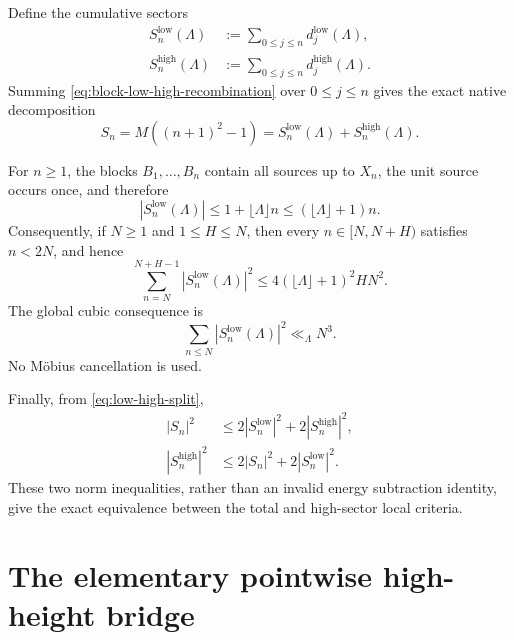 \documentclass[11pt]{article}
\theoremstyle{definition}
\theoremstyle{remark}
\newcommand{\1}{\mathbf{1}}
\begin{document}
Define the cumulative sectors
\begin{align}
 S_n^{\mathrm{low}}(\Lambda)
 &:={}
 \sum_{0\le j\le n}d_j^{\mathrm{low}}(\Lambda),
 \label{eq:low-prefix}\\
 S_n^{\mathrm{high}}(\Lambda)
 &:={}
 \sum_{0\le j\le n}d_j^{\mathrm{high}}(\Lambda).
 \label{eq:high-prefix}
\end{align}
Summing \cref{eq:block-low-high-recombination} over $0\le j\le n$ gives the exact native decomposition
\begin{equation}
 \boxed{
 S_n=M((n+1)^2-1)
 =S_n^{\mathrm{low}}(\Lambda)+S_n^{\mathrm{high}}(\Lambda).
 }
 \label{eq:low-high-split}
\end{equation}

For $n\ge1$, the blocks $B_1,\ldots,B_n$ contain all sources up to $X_n$, the unit source occurs once, and therefore
\begin{equation}
 |S_n^{\mathrm{low}}(\Lambda)|
 \le1+\lfloor\Lambda\rfloor n
 \le(\lfloor\Lambda\rfloor+1)n.
 \label{eq:low-prefix-bound}
\end{equation}
Consequently, if $N\ge1$ and $1\le H\le N$, then every
$n\in[N,N+H)$ satisfies $n<2N$, and hence
\begin{equation}
 \boxed{
 \sum_{n=N}^{N+H-1}
 |S_n^{\mathrm{low}}(\Lambda)|^2
 \le
 4(\lfloor\Lambda\rfloor+1)^2HN^2.
 }
 \label{eq:low-local-bound}
\end{equation}
The global cubic consequence is
\begin{equation}
 \sum_{n\le N}|S_n^{\mathrm{low}}(\Lambda)|^2
 \ll_{\Lambda}N^3.
 \label{eq:low-cubic}
\end{equation}
No M\"obius cancellation is used.

Finally, from \cref{eq:low-high-split},
\begin{align}
 |S_n|^2
 &\le2|S_n^{\mathrm{low}}|^2+2|S_n^{\mathrm{high}}|^2,
 \label{eq:total-from-low-high}\\
 |S_n^{\mathrm{high}}|^2
 &\le2|S_n|^2+2|S_n^{\mathrm{low}}|^2.
 \label{eq:high-from-total-low}
\end{align}
These two norm inequalities, rather than an invalid energy subtraction identity, give the exact equivalence between the total and high-sector local criteria.

\section{The elementary pointwise high-height bridge}
\label{sec:high-sector}
\end{document}

